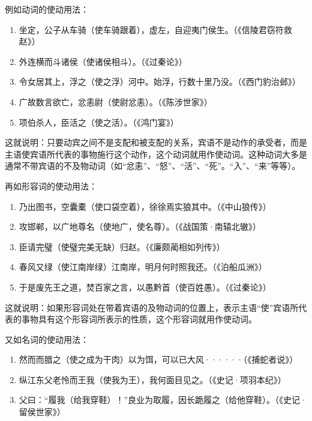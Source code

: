 例如动词的使动用法：

\begin{enumerate}[label=\textcircled{\arabic*}]
	\item 坐定，公子从车骑（使车骑跟着），虚左，自迎夷门侯生。（《信陵君窃符救赵》）
	\item 外连横而斗诸侯（使诸侯相斗）。（《过秦论》）
	\item 令女居其上，浮之（使之浮）河中。始浮，行数十里乃没。（《西门豹治邺》）
	\item 广故数言欲亡，忿恚尉（使尉忿恚）。（《陈涉世家》）
	\item 项伯杀人，臣活之（使之活）。（《鸿门宴》）
\end{enumerate}

这就说明：只要动宾之间不是支配和被支配的关系，宾语不是动作的承受者，而是主语使宾语所代表的事物施行这个动作，这个动词就用作使动词。这种动词大多是通常不带宾语的不及物动词（如“忿恚”、“怒”、“活”、“死”。“入”、“来”等等）。

再如形容词的使动用法：

\begin{enumerate}[label=\textcircled{\arabic*}]
	\item 乃出图书，空囊橐（使口袋空着），徐徐焉实狼其中。（《中山狼传》）
	\item 攻邯郸，以广地尊名（使地广，使名尊）。（《战国策·南辕北辙》）
	\item 臣请完璧（使璧完美无缺）归赵。（《廉颇蔺相如列传》）
	\item 春风又绿（使江南岸绿）江南岸，明月何时照我还。（《泊船瓜洲》）
	\item 于是废先王之道，焚百家之言，以愚黔首（使百姓愚）。（《过秦论》）
\end{enumerate}

这就说明：如果形容词处在带着宾语的及物动词的位置上，表示主语“使”宾语所代表的事物具有这个形容词所表示的性质，这个形容词就用作使动词。

又如名词的使动用法：

\begin{enumerate}[label=\textcircled{\arabic*}]
	\item 然而而腊之（使之成为干肉）以为饵，可以已大风······（《捕蛇者说》）
	\item 纵江东父老怜而王我（使我为王），我何面目见之。（《史记·项羽本纪》）
	\item 父曰：“履我（给我穿鞋）！”良业为取履，因长跪履之（给他穿鞋）。（《史记·留侯世家》）
\end{enumerate}
\newpage

